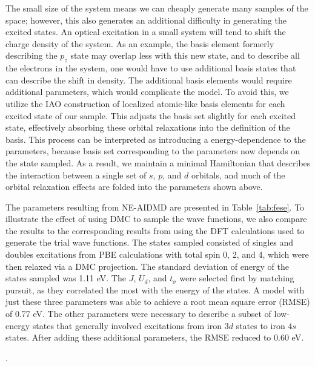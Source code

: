 The small size of the system means we can cheaply generate many samples of the space; however, this also generates an additional difficulty in generating the excited states. 
An optical excitation in a small system will tend to shift the charge density of the system.
As an example, the basis element formerly describing the $p_z$ state may overlap less with this new state, and to describe all the electrons in the system, one would have to use additional basis states that can describe the shift in density.
The additional basis elements would require additional parameters, which would complicate the model. 
To avoid this, we utilize the IAO construction \cite{IAO} of localized atomic-like basis elements for each excited state of our sample. 
This adjusts the basis set slightly for each excited state, effectively absorbing these orbital relaxations into the definition of the basis. 
This process can be interpreted as introducing a energy-dependence to the parameters, because basis set corresponding to the parameters now depends on the state sampled.
As a result, we maintain a minimal Hamiltonian that describes the interaction between a single set of $s$, $p$, and $d$ orbitals, and much of the orbital relaxation effects are folded into the parameters shown above.

The parameters resulting from NE-AIDMD are presented in Table~\ref{tab:fese}. 
To illustrate the effect of using DMC to sample the wave functions, we also compare the results to the corresponding results from using the DFT calculations used to generate the trial wave functions. 
The states sampled consisted of singles and doubles excitations from PBE calculations with total spin 0, 2, and 4, which were then relaxed via a DMC projection.
The standard deviation of energy of the states sampled was 1.11 eV.
The $J$, $U_d$, and $t_\sigma$ were selected first by matching pursuit, as they correlated the most with the energy of the states.
A model with just these three parameters was able to achieve a root mean square error (RMSE) of 0.77 eV.
The other parameters were necessary to describe a subset of low-energy states that generally involved excitations from iron $3d$ states to iron $4s$ states. 
After adding these additional parameters, the RMSE reduced to 0.60 eV.

.


